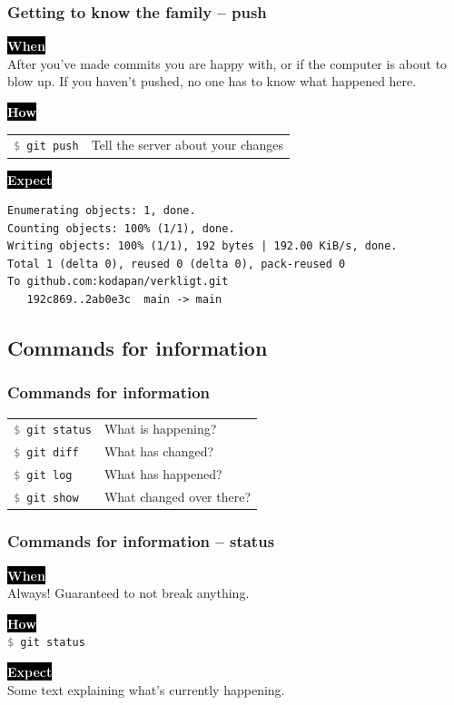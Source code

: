 \documentclass{beamer}
\newcommand{\keyword}[1]{\hspace{-1.0em}\colorbox{black}{\textcolor{white}{\textbf{#1}\vphantom{Ep}}}\vspace{0.2em}} %
\newcommand{\command}[1]{\texttt{\textcolor{gray}{\$} {#1}}}
\begin{document}
\begin{frame}[fragile]
  \frametitle{Getting to know the family -- push}
  \keyword{When}\\
    After you've made commits you are happy with, or if the computer
    is about to blow up. If you haven't pushed, no one has to know what
    happened here.\\
  \vspace{0.5em}

  \keyword{How}\\
  \hspace{-1.0em}
  \begin{tabular}{ll}
    \command{git push} & Tell the server about your changes \\
  \end{tabular}
  \vspace{0.5em}

  \keyword{Expect}\\ [0.1em]
\begin{verbatim}
Enumerating objects: 1, done.
Counting objects: 100% (1/1), done.
Writing objects: 100% (1/1), 192 bytes | 192.00 KiB/s, done.
Total 1 (delta 0), reused 0 (delta 0), pack-reused 0
To github.com:kodapan/verkligt.git
   192c869..2ab0e3c  main -> main
\end{verbatim}
\end{frame}

\subsection{Commands for information}

\begin{frame}[fragile]
  \frametitle{Commands for information}

  \begin{tabular}{ll}
    \command{git status} & What is happening? \\
    \command{git diff} & What has changed? \\
    \command{git log} & What has happened? \\
    \command{git show} & What changed over there? \\
  \end{tabular}

\end{frame}

\begin{frame}
  \frametitle{Commands for information -- status}

  \keyword{When}\\
  Always! Guaranteed to not break anything.
  \vspace{0.5em}

  \keyword{How}\\
  \command{git status}
  \vspace{0.5em}

  \keyword{Expect}\\
  Some text explaining what's currently happening.
\end{frame}
\end{document}
